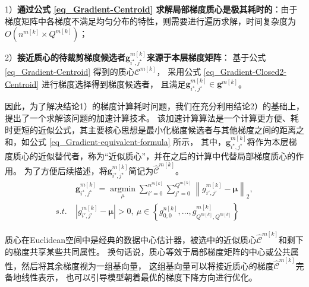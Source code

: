 \documentclass{xdupgthesis}
\begin{document}
1）\textbf{通过公式 \eqref{eq_Gradient-Centroid} 求解局部梯度质心是极其耗时的}：由于梯度矩阵中各梯度不满足均匀分布的特性，则需要进行遍历求解，时间复杂度为$O\left(n^{m[k]} \times Q^{m[k]}  \right)$；

2）\textbf{接近质心的待裁剪梯度候选者$\mathbf{g}_{i^{\star}, j^{\star}}^{m[k]}$来源于本层梯度矩阵}：
基于公式 \eqref{eq_Gradient-Centroid} 得到的质心$\mathcal{C}^{m[k]}$，
采用公式 \eqref{eq_Gradient-Closed2-Centroid} 进行梯度选择得到梯度候选者，
且满足$\mathbf{g}_{i^{\star}, j^{\star}}^{m[k]} \in \mathbf{g}^{m[k]}$。

因此，为了解决结论1）的梯度计算耗时问题，我们在充分利用结论2）的基础上，提出了一个求解该问题的加速计算技术。
该加速计算算法是一个计算更方便、耗时更短的近似公式，其主要核心思想是最小化梯度候选者与其他梯度之间的距离之和，如公式 \eqref{eq_Gradient-equivalent-formula} 所示，
其中，$\mathbf{g}_{i^{\star}, j^{\star}}^{m[k]}$将作为本层梯度质心的近似替代者，称为“近似质心”，并在之后的计算中代替局部梯度质心的作用。
为了方便后续描述，将$\mathbf{g}_{i^{\star}, j^{\star}}^{m[k]}$简记为$\hat{\mathcal{C}}^{m[k]}$。
\begin{equation}
    \begin{aligned}
        &\mathbf{g}_{i^{\star}, j^{\star}}^{m[k]} =
            \mathop{\arg\min}\limits_{\mu} 
                \sum_{i'=0}^{n^{m[k]}} \sum_{j'=0}^{Q^{m[k]}}
                    \left\lVert 
                        g_{i', j'}^{m[k]} - \mathbf{\mu} 
                    \right\rVert_{2}, \\
        s.t. \ &\left|g_{i', j'}^{m[k]} - \mathbf{\mu}\right|>0,
        \ \mu \in \left\{ g_{0, 0}^{n[k]}, \dots, g_{Q^{m[k]}, Q^{m[k]}}^{m[k]} \right\}
    \end{aligned}
    \label{eq_Gradient-equivalent-formula}
\end{equation}

质心在Euclidean空间中是经典的数据中心估计器\cite{fletcher2008robust}，被选中的近似质心$\hat{\mathcal{C}}^{m[k]}$和剩下的梯度共享某些共同属性。
换句话说，质心等效于局部梯度矩阵的中心或公共属性，然后将其余梯度视为一组基向量，
这组基向量可以将接近质心的梯度$\hat{\mathcal{C}}^{m[k]}$完备地线性表示，
也可以引导模型朝着最优的梯度下降方向进行优化。
\end{document}
